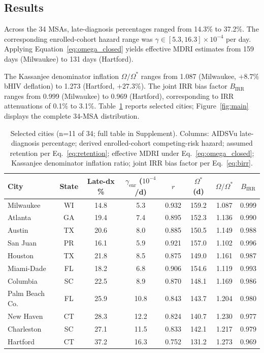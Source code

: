 \documentclass[11pt]{article}
\begin{document}
\subsection{Results}

Across the 34 MSAs, late-diagnosis percentages ranged from 14.3\% to 37.2\%. The corresponding enrolled-cohort hazard range was $\gamma \in [5.3, 16.3] \times 10^{-4}$ per day. Applying Equation~\ref{eq:omega_closed} yields effective MDRI estimates from 159 days (Milwaukee) to 131 days (Hartford).

The Kassanjee denominator inflation $\Omega/\Omega^*$ ranges from 1.087 (Milwaukee, $+8.7\%$ bHIV deflation) to 1.273 (Hartford, $+27.3\%$). The joint IRR bias factor $B_{\mathrm{IRR}}$ ranges from 0.999 (Milwaukee) to 0.969 (Hartford), corresponding to IRR attenuations of 0.1\% to 3.1\%. Table~\ref{tab:selected_cities} reports selected cities; Figure~\ref{fig:main} displays the complete 34-MSA distribution.

\begin{table}[h]
\centering
\small
\caption{Selected cities (n=11 of 34; full table in Supplement). Columns: AIDSVu late-diagnosis percentage; derived enrolled-cohort competing-risk hazard; assumed retention per Eq.~\ref{eq:retention}; effective MDRI under Eq.~\ref{eq:omega_closed}; Kassanjee denominator inflation ratio; joint IRR bias factor per Eq.~\ref{eq:birr}.}
\label{tab:selected_cities}
\begin{tabular}{lccccccc}
\toprule
City & State & Late-dx \% & $\gamma_{\mathrm{enr}}$ ($10^{-4}$/d) & $r$ & $\Omega^*$ (d) & $\Omega/\Omega^*$ & $B_{\mathrm{IRR}}$ \\
\midrule
Milwaukee & WI & 14.8 & 5.3 & 0.932 & 159.2 & 1.087 & 0.999 \\
Atlanta & GA & 19.4 & 7.4 & 0.895 & 152.3 & 1.136 & 0.990 \\
Austin & TX & 20.6 & 8.0 & 0.885 & 150.5 & 1.149 & 0.988 \\
San Juan & PR & 16.1 & 5.9 & 0.921 & 157.0 & 1.102 & 0.996 \\
Houston & TX & 21.8 & 8.5 & 0.875 & 149.0 & 1.161 & 0.987 \\
Miami-Dade & FL & 18.2 & 6.8 & 0.906 & 154.6 & 1.119 & 0.993 \\
Columbia & SC & 22.5 & 8.9 & 0.870 & 148.1 & 1.169 & 0.986 \\
Palm Beach Co. & FL & 25.9 & 10.8 & 0.843 & 143.7 & 1.204 & 0.980 \\
New Haven & CT & 28.3 & 12.2 & 0.824 & 140.7 & 1.230 & 0.977 \\
Charleston & SC & 27.1 & 11.5 & 0.833 & 142.1 & 1.217 & 0.979 \\
Hartford & CT & 37.2 & 16.3 & 0.752 & 131.2 & 1.273 & 0.969 \\
\bottomrule
\end{tabular}
\end{table}
\end{document}
